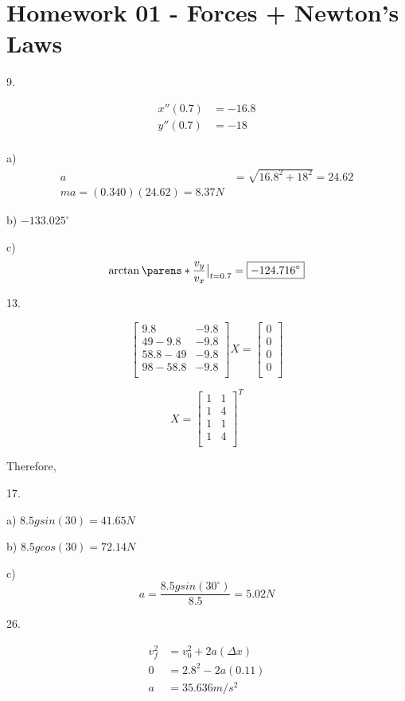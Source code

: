 \documentclass{scrreprt} %
\begin{document}
\section{Homework 01 - Forces + Newton's Laws}

9.

\begin{align*}
	x''(0.7) &= -16.8 \\
	y''(0.7) &= -18 \\
\end{align*}

a) \begin{align*}
a &= \sqrt{16.8^2 + 18^2} = 24.62 \\
ma = (0.340)(24.62) = \boxed{8.37 N}
\end{align*}

b) $-133.025^\circ$

c) $$\evalat{\arctan \parens*{\frac{v_y}{v_x}}}{t = 0.7} = \boxed{-124.716^\circ}$$

13.

$$
\begin{bmatrix}
	9.8 & - 9.8 \\
	49 - 9.8 & -9.8 \\
	58.8 - 49 & -9.8 \\
	98 - 58.8 & -9.8 \\
\end{bmatrix}
X
=
\begin{bmatrix}
	0 \\
	0 \\
	0 \\
	0 \\
\end{bmatrix}
$$

$$
X = \begin{bmatrix}
	1 & 1 \\
	1 & 4 \\
	1 & 1 \\
	1 & 4 \\
\end{bmatrix}^T
$$

Therefore, 

17.

a) $8.5gsin(30) = \boxed{41.65 N}$

b) $8.5gcos(30) = \boxed{72.14 N}$

c) $$a = \frac{8.5gsin(30^{\circ})}{8.5} = 5.02 N$$

26.

\begin{align*}
	v_f^2 &= v_0^2 + 2a(\Delta x) \\
	0 &= 2.8^2 - 2a(0.11) \\
	a &= 35.636 m/s^2
\end{align*}
\end{document}
